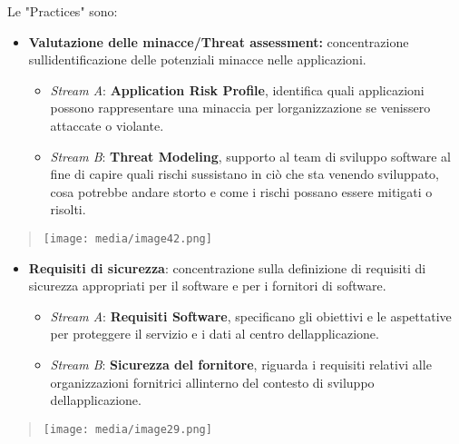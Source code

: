 Le "Practices" sono:

\begin{itemize}
\item
  \textbf{Valutazione delle minacce/Threat assessment:} concentrazione
  sull\textquotesingle identificazione delle potenziali minacce nelle
  applicazioni.

  \begin{itemize}
  \item
    \emph{Stream A}: \textbf{Application Risk Profile}, identifica quali
    applicazioni possono rappresentare una minaccia per
    l\textquotesingle organizzazione se venissero attaccate o violante.
  \item
    \emph{Stream B}: \textbf{Threat Modeling}, supporto al team di
    sviluppo software al fine di capire quali rischi sussistano in ciò
    che sta venendo sviluppato, cosa potrebbe andare storto e come i
    rischi possano essere mitigati o risolti.
  \end{itemize}
\end{itemize}

\begin{quote}
\texttt{[image: media/image42.png]}
\end{quote}

\begin{itemize}
\item
  \textbf{Requisiti di sicurezza}: concentrazione sulla definizione di
  requisiti di sicurezza appropriati per il software e per i fornitori
  di software.

  \begin{itemize}
  \item
    \emph{Stream A}: \textbf{Requisiti Software}, specificano gli
    obiettivi e le aspettative per proteggere il servizio e i dati al
    centro dell\textquotesingle applicazione.
  \item
    \emph{Stream B}: \textbf{Sicurezza del fornitore}, riguarda i
    requisiti relativi alle organizzazioni fornitrici
    all\textquotesingle interno del contesto di sviluppo
    dell\textquotesingle applicazione.
  \end{itemize}
\end{itemize}

\begin{quote}
\texttt{[image: media/image29.png]}
\end{quote}

